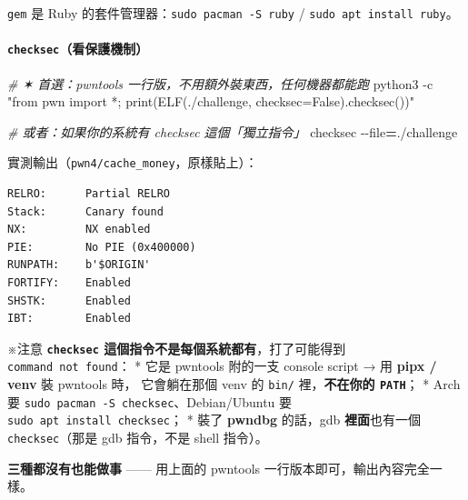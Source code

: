 \documentclass[10pt,a4paper]{article}
\newenvironment{Shaded}{\begin{snugshade}}{\end{snugshade}}
\newcommand{\AttributeTok}[1]{\textcolor[rgb]{0.13,0.29,0.53}{#1}}
\newcommand{\CommentTok}[1]{\textcolor[rgb]{0.56,0.35,0.01}{\textit{#1}}}
\newcommand{\ExtensionTok}[1]{#1}
\newcommand{\NormalTok}[1]{#1}
\newcommand{\OperatorTok}[1]{\textcolor[rgb]{0.81,0.36,0.00}{\textbf{#1}}}
\newcommand{\StringTok}[1]{\textcolor[rgb]{0.31,0.60,0.02}{#1}}
\renewenvironment{Shaded}{%
  \def\FrameCommand{\fboxsep=3.2pt\colorbox{shadecolor}}%
  \MakeFramed{\advance\hsize-\width\FrameRestore\small}%
}{%
  \endMakeFramed
}
\renewenvironment{quote}{%
  \begin{mdframed}[linewidth=0pt,innerleftmargin=0pt,innerrightmargin=0pt,
    innerbottommargin=0pt,innertopmargin=0pt,skipabove=0.55em,skipbelow=0.55em,
    leftmargin=0.9em,rightmargin=0.4em,startcode={\color{quotebar}\vrule width 2.6pt},%
    endcode={}]%
  \itshape\color{black}%
}{%
  \end{mdframed}%
}
\begin{document}
\begin{quote}
\texttt{gem} 是 Ruby 的套件管理器：\texttt{sudo\ \allowbreak{}pacman\ \allowbreak{}-\allowbreak{}S\ \allowbreak{}ruby} /
\texttt{sudo\ \allowbreak{}apt\ \allowbreak{}install\ \allowbreak{}ruby}。
\end{quote}

\paragraph{\texorpdfstring{\texttt{checksec}（看保護機制）}{checksec（看保護機制）}}\label{checksecux770bux4fddux8b77ux6a5fux5236}

\begin{Shaded}
\begin{Highlighting}[]
\CommentTok{\# ✶ 首選：pwntools 一行版，不用額外裝東西，任何機器都能跑}
\ExtensionTok{python3} \AttributeTok{{-}c} \StringTok{"from pwn import *; print(ELF(\textquotesingle{}./challenge\textquotesingle{}, checksec=False).checksec())"}

\CommentTok{\# 或者：如果你的系統有 \textasciigrave{}checksec\textasciigrave{} 這個「獨立指令」}
\ExtensionTok{checksec} \AttributeTok{{-}{-}file}\OperatorTok{=}\NormalTok{./challenge}
\end{Highlighting}
\end{Shaded}

實測輸出（\texttt{pwn4/\allowbreak{}cache\_\allowbreak{}money}，原樣貼上）：

\begin{Verbatim}[breaklines=true,breakanywhere=true,breakautoindent=false,fontsize=\fontsize{7.0}{9.5}\selectfont]
RELRO:      Partial RELRO
Stack:      Canary found
NX:         NX enabled
PIE:        No PIE (0x400000)
RUNPATH:    b'$ORIGIN'
FORTIFY:    Enabled
SHSTK:      Enabled
IBT:        Enabled
\end{Verbatim}

\begin{quote}
※注意 \textbf{\texttt{checksec} 這個指令不是每個系統都有}，打了可能得到
\texttt{command\ \allowbreak{}not\ \allowbreak{}found}： * 它是 pwntools 附的一支 console script →
用 \textbf{pipx / venv} 裝 pwntools 時， 它會躺在那個 venv 的
\texttt{bin/} 裡，\textbf{不在你的 \texttt{PATH}}； * Arch 要
\texttt{sudo\ \allowbreak{}pacman\ \allowbreak{}-\allowbreak{}S\ \allowbreak{}checksec}、Debian/Ubuntu 要
\texttt{sudo\ \allowbreak{}apt\ \allowbreak{}install\ \allowbreak{}checksec}； * 裝了 \textbf{pwndbg} 的話，gdb
\textbf{裡面}也有一個 \texttt{checksec}（那是 gdb 指令，不是 shell
指令）。

\textbf{三種都沒有也能做事} ------ 用上面的 pwntools
一行版本即可，輸出內容完全一樣。
\end{quote}
\end{document}
